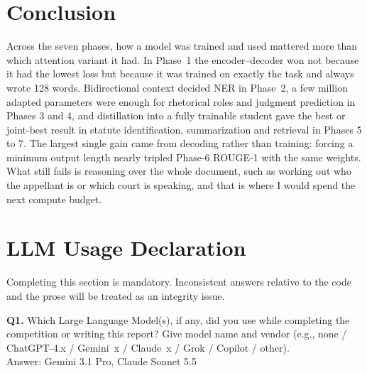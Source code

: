 \documentclass[11pt, oneside]{article}
\begin{document}
\section{Conclusion}
\vspace{-5pt}
Across the seven phases, how a model was trained and used mattered more than which attention variant it had. In Phase~1 the encoder--decoder won not because it had the lowest loss but because it was trained on exactly the task and always wrote 128 words. Bidirectional context decided NER in Phase~2, a few million adapted parameters were enough for rhetorical roles and judgment prediction in Phases 3 and 4, and distillation into a fully trainable student gave the best or joint-best result in statute identification, summarization and retrieval in Phases 5 to 7. The largest single gain came from decoding rather than training: forcing a minimum output length nearly tripled Phase-6 ROUGE-1 with the same weights. What still fails is reasoning over the whole document, such as working out who the appellant is or which court is speaking, and that is where I would spend the next compute budget.

\section*{LLM Usage Declaration}
Completing this section is mandatory. Inconsistent answers relative to the code and the prose will be treated as an integrity issue.
\medskip

\noindent
\textbf{Q1.} Which Large Language Model(s), if any, did you use while completing the competition or writing this report? Give model name and vendor (e.g., none / ChatGPT-4.x / Gemini~x / Claude~x / Grok / Copilot / other). \\[0.6em]
Answer: Gemini 3.1 Pro, Claude Sonnet 5.5
\end{document}
